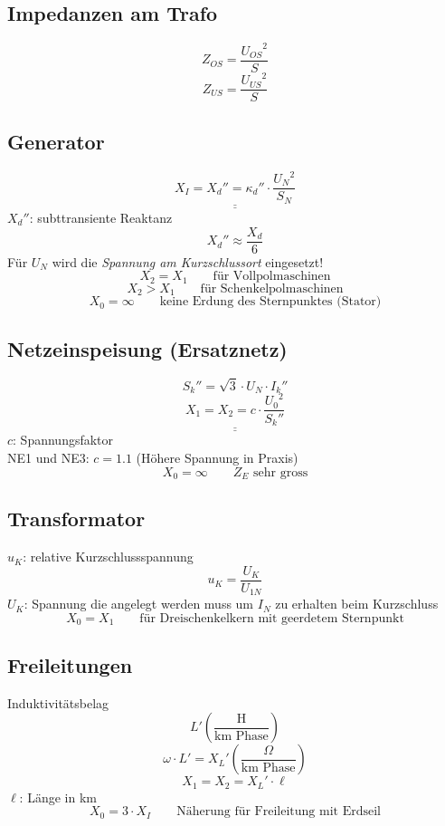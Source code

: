 \documentclass[a4,paper,fleqn]{article}
\begin{document}
\subsection{Impedanzen am Trafo}
\[ Z_{OS} = \frac{{U_{OS}}^2}{S} \]
\[ Z_{US} = \frac{{U_{US}}^2}{S} \]

\subsection{Generator}
\[ \underline{\underline{X_I = X_d'' = \kappa_d'' \cdot \frac{{U_N}^2}{S_N}}} \]
${X_d}''$: subttransiente Reaktanz
\[ {X_d}'' \approx \frac{X_d}{6} \]
Für $U_N$ wird die \emph{Spannung am Kurzschlussort} eingesetzt! 
\[ X_2 = X_1    \qquad \text{für Vollpolmaschinen} \]
\[ X_2 > X_1    \qquad \text{für Schenkelpolmaschinen} \]
\[ X_0 = \infty \qquad \text{keine Erdung des Sternpunktes (Stator)} \]

\subsection{Netzeinspeisung (Ersatznetz)}
\[ {S_k}'' = \sqrt{3} \cdot U_N \cdot {I_k}'' \]
\[ \underline{\underline{X_1 = X_2 = c \cdot \frac{{U_0}^2}{{S_k}''}}} \]
$c$: Spannungsfaktor \\
NE1 und NE3: $c = 1.1$ (Höhere Spannung in Praxis)
\[ X_0 = \infty \qquad \text{$Z_E$ sehr gross} \]

\subsection{Transformator}
$u_K$: relative Kurzschlussspannung
\[ u_K = \frac{U_K}{U_{1N}} \]
$U_K$: Spannung die angelegt werden muss um $I_N$ zu erhalten beim Kurzschluss
\[ X_0 = X_1 \qquad \text{für Dreischenkelkern mit geerdetem Sternpunkt} \]

\subsection{Freileitungen}
Induktivitätsbelag
\[ L' \left(\frac{\text{H}}{\text{km Phase}}\right) \]
\[ \omega \cdot L' = {X_L}' \left(\frac{\text{$\Omega$}}{\text{km Phase}}\right) \]
\[ X_1 = X_2 = {X_L}' \cdot \ell \]
$\ell$: Länge in km
\[ X_0 = 3 \cdot X_I \qquad \text{Näherung für Freileitung mit Erdseil} \]
\end{document}

